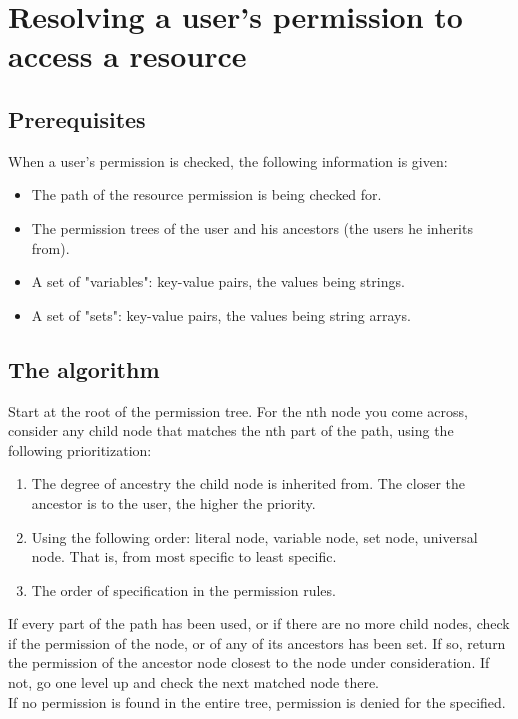 \documentclass{article}
\begin{document}
	\section{Resolving a user's permission to access a resource}
	\subsection{Prerequisites}
	When a user's permission is checked, the following information is given:
	\begin{itemize}
		\item The path of the resource permission is being checked for.
		\item The permission trees of the user and his ancestors (the users he inherits from).
		\item A set of "variables": key-value pairs, the values being strings.
		\item A set of "sets": key-value pairs, the values being string arrays.
	\end{itemize}

	\subsection{The algorithm}
	Start at the root of the permission tree. For the nth node you come across, consider any child node that matches the nth part of the path, using the following prioritization:
	\begin{enumerate}
		\item The degree of ancestry the child node is inherited from. The closer the ancestor is to the user, the higher the priority.
		\item Using the following order: literal node, variable node, set node, universal node. That is, from most specific to least specific.
		\item The order of specification in the permission rules.
	\end{enumerate}
	If every part of the path has been used, or if there are no more child nodes, check if the permission of the node, or of any of its ancestors has been set. If so, return the permission of the ancestor node closest to the node under consideration. If not, go one level up and check the next matched node there.\\
	If no permission is found in the entire tree, permission is denied for the specified.
\end{document}
